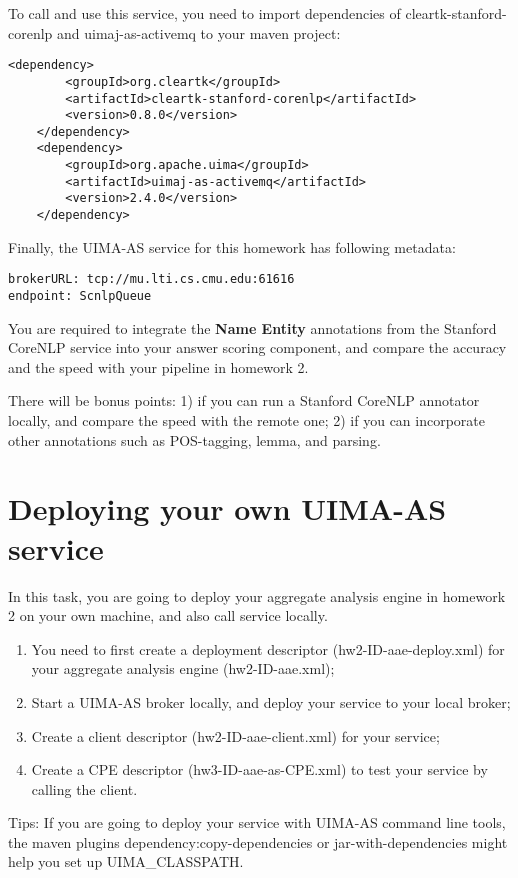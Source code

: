 To call and use this service, you need to import dependencies of 
cleartk-stanford-corenlp and uimaj-as-activemq to your maven project:
\begin{lstlisting}[frame=single, numbers=none]  
	<dependency>
		<groupId>org.cleartk</groupId>
		<artifactId>cleartk-stanford-corenlp</artifactId>
		<version>0.8.0</version>
	</dependency>
	<dependency>
		<groupId>org.apache.uima</groupId>
		<artifactId>uimaj-as-activemq</artifactId>
		<version>2.4.0</version>
	</dependency>
\end{lstlisting}

Finally, the UIMA-AS service for this homework has following metadata:
\begin{lstlisting}[frame=single, numbers=none]  
brokerURL: tcp://mu.lti.cs.cmu.edu:61616
endpoint: ScnlpQueue
\end{lstlisting}

You are required to integrate the \textbf {Name Entity} annotations from the Stanford CoreNLP service into your answer scoring component, 
and compare the accuracy and the speed with your pipeline in homework 2.  

There will be bonus points: 
1) if you can run a Stanford CoreNLP annotator locally, and compare the speed with the remote one;
2) if you can incorporate other annotations such as POS-tagging, lemma, and parsing. 



\section{Deploying your own UIMA-AS service}

In this task, you are going to deploy your aggregate analysis engine in homework 2 on your own machine, 
and also call service locally.  
\begin{enumerate}
  \item You need to first create a deployment descriptor (hw2-ID-aae-deploy.xml)
for your aggregate analysis engine (hw2-ID-aae.xml);
\item Start a UIMA-AS broker locally, and deploy your service to your local broker;
\item Create a client descriptor (hw2-ID-aae-client.xml) for your service;
\item Create a CPE descriptor (hw3-ID-aae-as-CPE.xml) to test your service by calling the client.  
\end{enumerate}

Tips: If you are going to deploy your service with UIMA-AS command line tools, 
the maven plugins dependency:copy-dependencies or jar-with-dependencies might help you set up UIMA\_CLASSPATH.

